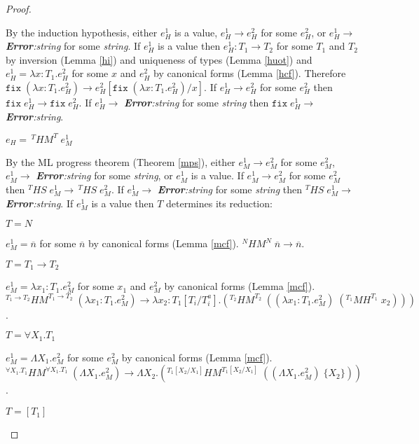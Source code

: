 \begin{theorem}
\begin{proof}
\begin{case}
By the induction hypothesis, either $e_{H}^{1}$ is a value, $e_{H}^{1}\rightarrow e_{H}^{2}$ for some $e_{H}^{2}$, or $e_{H}^{1}\rightarrow$ \emph{\textbf{Error}:\;string} for some \emph{string}.  If $e_{H}^{1}$ is a value then $e_{H}^{1}:T_{1}\rightarrow T_{2}$ for some $T_{1}$ and $T_{2}$ by inversion (Lemma \ref{hi}) and uniqueness of types (Lemma \ref{huot}) and $e_{H}^{1}=\lambda x:T_{1}.e_{H}^{2}$ for some $x$ and $e_{H}^{2}$ by canonical forms (Lemma \ref{hcf}).  Therefore $\mathtt{fix}\;(\lambda x:T_{1}.e_{H}^{2})\rightarrow e_{H}^{2}[\mathtt{fix}\;(\lambda x:T_{1}.e_{H}^{2})/x]$.  If $e_{H}^{1}\rightarrow e_{H}^{2}$ for some $e_{H}^{2}$ then $\mathtt{fix}\;e_{H}^{1}\rightarrow\mathtt{fix}\;e_{H}^{2}$.  If $e_{H}^{1}\rightarrow$ \emph{\textbf{Error}:\;string} for some \emph{string} then $\mathtt{fix}\;e_{H}^{1}\rightarrow$ \emph{\textbf{Error}:\;string}.
\end{case}
\begin{case}
$e_{H}=\,^{T}HM^{T}\;e_{M}^{1}$

By the ML progress theorem (Theorem \ref{mps}), either $e_{M}^{1}\rightarrow e_{M}^{2}$ for some $e_{M}^{2}$, $e_{M}^{1}\rightarrow$ \emph{\textbf{Error}:\;string} for some \emph{string}, or $e_{M}^{1}$ is a value.  If $e_{M}^{1}\rightarrow e_{M}^{2}$ for some $e_{M}^{2}$ then $^{T}HS\;e_{M}^{1}\rightarrow\,^{T}HS\;e_{M}^{2}$.  If $e_{M}^{1}\rightarrow$ \emph{\textbf{Error}:\;string} for some \emph{string} then $^{T}HS\;e_{M}^{1}\rightarrow$ \emph{\textbf{Error}:\;string}.  If $e_{M}^{1}$ is a value then $T$ determines its reduction:
\begin{case}
$T=N$

$e_{M}^{1}=\overline{n}$ for some $\overline{n}$ by canonical forms (Lemma \ref{mcf}).  $^{N}HM^{N}\;\overline{n}\rightarrow\overline{n}$.
\end{case}
\begin{case}
$T=T_{1}\rightarrow T_{2}$

$e_{M}^{1}=\lambda x_{1}:T_{1}.e_{M}^{2}$ for some $x_{1}$ and $e_{M}^{2}$ by canonical forms (Lemma \ref{mcf}).  $^{T_{1}\rightarrow T_{2}}HM^{T_{1}\rightarrow T_{2}}\;(\lambda x_{1}:T_{1}.e_{M}^{2})\rightarrow\lambda x_{2}:T_{1}[T_{i}/T^{a}_{i}].(^{T_{2}}HM^{T_{2}}\;((\lambda x_{1}:T_{1}.e_{M}^{2})\;(^{T_{1}}MH^{T_{1}}\;x_{2})))$.
\end{case}
\begin{case}
$T=\forall X_{1}.T_{1}$

$e_{M}^{1}=\Lambda X_{1}.e_{M}^{2}$ for some $e_{M}^{2}$ by canonical forms (Lemma \ref{mcf}).  $^{\forall X_{1}.T_{1}}HM^{\forall X_{1}.T_{1}}\;(\Lambda X_{1}.e_{M}^{2})\rightarrow\Lambda X_{2}.(^{T_{1}[X_{2}/X_{1}]}HM^{T_{1}[X_{2}/X_{1}]}\;((\Lambda X_{1}.e_{M}^{2})\;\lbrace X_{2}\rbrace))$.
\end{case}
\begin{case}
$T=[T_{1}]$


\end{case}
\end{case}
\end{proof}
\end{theorem}
